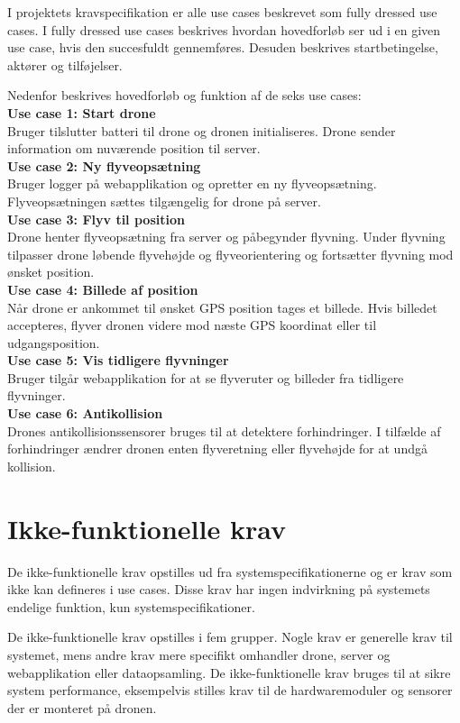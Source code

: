 \newpage

I projektets kravspecifikation er alle use cases beskrevet som fully dressed use cases. I fully dressed use cases beskrives hvordan hovedforløb ser ud i en given use case, hvis den succesfuldt gennemføres. Desuden beskrives startbetingelse, aktører og tilføjelser.

Nedenfor beskrives hovedforløb og funktion af de seks use cases:\\

\textbf{Use case 1: Start drone} \\
Bruger tilslutter batteri til drone og dronen initialiseres. Drone sender information om nuværende position til server.\\

\textbf{Use case 2: Ny flyveopsætning} \\
Bruger logger på webapplikation og opretter en ny flyveopsætning. Flyveopsætningen sættes tilgængelig for drone på server.\\

\textbf{Use case 3: Flyv til position}\\
Drone henter flyveopsætning fra server og påbegynder flyvning. Under flyvning tilpasser drone  løbende flyvehøjde og flyveorientering og fortsætter flyvning mod ønsket position. \\

\textbf{Use case 4: Billede af position} \\
Når drone er ankommet til ønsket GPS position tages et billede. Hvis billedet accepteres, flyver dronen videre mod næste GPS koordinat eller til udgangsposition. \\

\textbf{Use case 5: Vis tidligere flyvninger} \\
Bruger tilgår webapplikation for at se flyveruter og billeder fra tidligere flyvninger.\\

\textbf{Use case 6: Antikollision} \\
Drones antikollisionssensorer bruges til at detektere forhindringer. I tilfælde af forhindringer ændrer dronen enten flyveretning eller flyvehøjde for at undgå kollision. \\



\section{Ikke-funktionelle krav}

De ikke-funktionelle krav opstilles ud fra systemspecifikationerne og er krav som ikke kan defineres i use cases. Disse krav har ingen indvirkning på systemets endelige funktion, kun systemspecifikationer.  

De ikke-funktionelle krav opstilles i fem grupper. Nogle krav er generelle krav til systemet, mens andre krav mere specifikt omhandler drone, server og webapplikation eller dataopsamling. 
De ikke-funktionelle krav bruges til at sikre system performance, eksempelvis stilles krav til de hardwaremoduler og sensorer der er monteret på dronen. 
